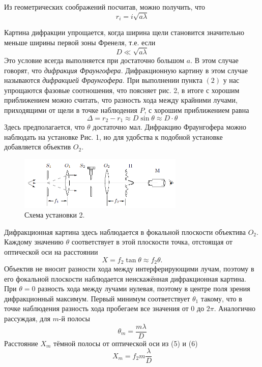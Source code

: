 \documentclass[a4paper, 12pt]{article}%
\begin{document}
	 Из геометрических соображений посчитав, можно получить, что 
	 \begin{equation}
	 	r_i = i \sqrt{a \lambda}
	 \end{equation}
	 
	 Картина дифракции упрощается, когда ширина щели становится значительно меньше ширины первой зоны Френеля, т.е. если 
	 \begin{equation}
	 	D \ll\sqrt{a \lambda} 
	 \end{equation}	
	 Это условие всегда выполняется при достаточно большом $a$. В этом случае говорят, что \textit{дифракция Фраунгофера}. Дифракционную картину в этом случае называются \textit{дифракцией Фраунгофера}. При выполнении пункта $(2)$ у нас упрощаются фазовые соотношения, что поясняет рис. 2, в итоге с хорошим приближением можно считать, что разность хода между крайними лучами, приходящими от щели в точке наблюдения $P$, с хорошим приближением равна 
	 \begin{equation}
	 	\Delta = r_2 - r_1 \approx D \sin \theta \approx D \cdot \theta
	 \end{equation}
	 Здесь предполагается, что $\theta$ достаточно мал.
	 Дифракцию Фраунгофера можно наблюдать на установке Рис. 1, но для удобства к подобной установке добавляется объектив $O_2$.
	 
	 \begin{figure}[h]
	 	\includegraphics[width = 0.7\textwidth]{3.png}
	 	\centering
	 	\caption{Схема установки 2.}
	 \end{figure}
	 Дифракционная картина здесь наблюдается в фокальной плоскости объектива $O_2$. Каждому значению $\theta$ соответствует в этой плоскости точка, отстоящая от оптической оси на расстоянии 
	 \begin{equation}
	 	X = f_2 \tan \theta \approx f_2 \theta.
	 \end{equation}
	 Объектив не вносит разности хода между интерферирующими лучам, поэтому в его фокальной плоскости наблюдается неискажённая дифракционная картина. При $\theta = 0$ разность хода между лучами нулевая, поэтому в центре поля зрения дифракционный максимум. Первый минимум соответствует $\theta_1$ такому, что в точке наблюдения разность хода пробегаем все значения от 0 до $2\pi$. Аналогично рассуждая, для $m$-й полосы
	 \begin{equation}
	 	\theta_m = \frac{m \lambda}{D}
	 \end{equation}
	 Расстояние $X_m$ тёмной полосы от оптической оси из (5) и (6)
	 \begin{equation}
	 	X_m = f_2m\frac{\lambda}{D}
	 \end{equation} \\
 
\end{document}
